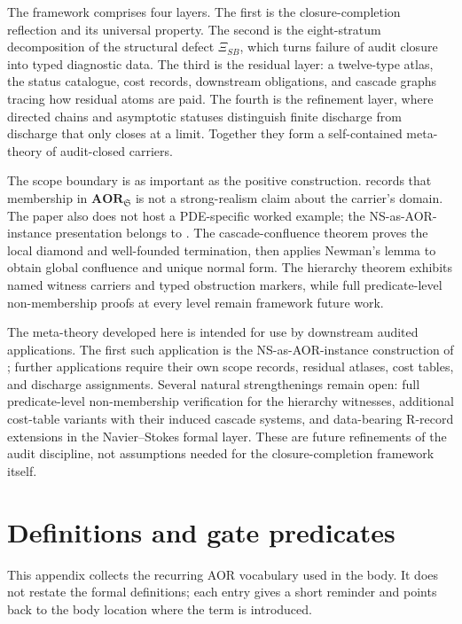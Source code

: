 \documentclass[11pt]{article}
\newcommand{\AOR}{\mathbf{AOR}}
\newcommand{\XiSB}{\Xi_{SB}}
\theoremstyle{definition}
\begin{document}
The framework comprises four layers.  The first is the
closure-completion reflection and its universal property.  The second
is the eight-stratum decomposition of the structural defect $\XiSB$,
which turns failure of audit closure into typed diagnostic data.  The
third is the residual layer: a twelve-type atlas, the status
catalogue, cost records, downstream obligations, and cascade graphs
tracing how residual atoms are paid.  The fourth is the refinement
layer, where directed chains and asymptotic statuses distinguish
finite discharge from discharge that only closes at a limit.
Together they form a self-contained meta-theory of audit-closed
carriers.

The scope boundary is as important as the positive construction.
 records that membership in
$\AOR_{\mathfrak S}$ is not a strong-realism claim about the carrier's
domain.  The paper also does not host a PDE-specific worked example;
the NS-as-AOR-instance presentation belongs to
\citet{Tsiokos2026NavierStokes}.  The cascade-confluence theorem
proves the local diamond and well-founded termination, then applies
Newman's lemma to obtain global confluence and unique normal form.  The
hierarchy theorem exhibits named witness carriers and typed
obstruction markers, while full predicate-level non-membership proofs
at every level remain framework future work.

The meta-theory developed here is intended for use by downstream
audited applications.  The first such application is the
NS-as-AOR-instance construction of
\citet{Tsiokos2026NavierStokes}; further applications require their
own scope records, residual atlases, cost tables, and discharge
assignments.  Several natural strengthenings remain open: full
predicate-level non-membership verification for the hierarchy witnesses,
additional cost-table variants with their induced cascade systems, and
data-bearing R-record extensions in the Navier--Stokes formal layer.  These are
future refinements of the audit discipline, not assumptions needed
for the closure-completion framework itself.
 
\appendix
\section{Definitions and gate predicates}\label{app:definitions}

This appendix collects the recurring AOR vocabulary used in the body.
It does not restate the formal definitions; each entry gives a short
reminder and points back to the body location where the term is
introduced.
\end{document}
